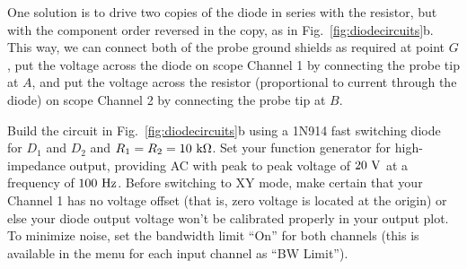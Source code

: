 One solution is to drive two copies of the diode in series with the
resistor, but with the component order reversed in the copy, as in
Fig.~\ref{fig:diodecircuits}b.  This way, we can connect both of the
probe ground shields as required at point $G$, put the voltage across
the diode on scope Channel 1 by connecting the probe tip at $A$, and
put the voltage across the resistor (proportional to current through
the diode) on scope Channel 2 by connecting the probe tip at $B$.

Build the circuit in Fig.~\ref{fig:diodecircuits}b using a 1N914 fast
switching diode for $D_1$ and $D_2$ and $R_1= R_2 = 10~{\rm k\Omega}$.
Set your function generator for high-impedance output, providing AC
with peak to peak voltage of $20~\rm V$ at a frequency of $100~\rm
Hz$.  Before switching to XY mode, make certain that your Channel 1
has no voltage offset (that is, zero voltage is located at the origin)
or else your diode output voltage won't be calibrated properly in your
output plot.  To minimize noise, set the bandwidth limit ``On'' for
both channels (this is available in the menu for each input channel as
``BW Limit'').

